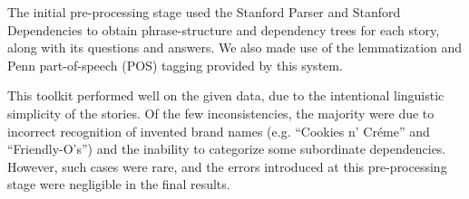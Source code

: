 The initial pre-processing stage used the Stanford Parser \cite{stanford_parser} and Stanford Dependencies \cite{de2008stanford} to obtain phrase-structure and dependency trees for each story, along with its questions and answers. We also made use of the lemmatization and Penn part-of-speech (POS) tagging \cite{marcus1993building} provided by this system.

This toolkit performed well on the given data, due to the intentional linguistic simplicity of the stories. Of the few inconsistencies, the majority were due to incorrect recognition of invented brand names (e.g. ``Cookies n' Cr\'{e}me'' and ``Friendly-O's'') and the inability to categorize some subordinate dependencies. However, such cases were rare, and the errors introduced at this pre-processing stage were negligible in the final results.